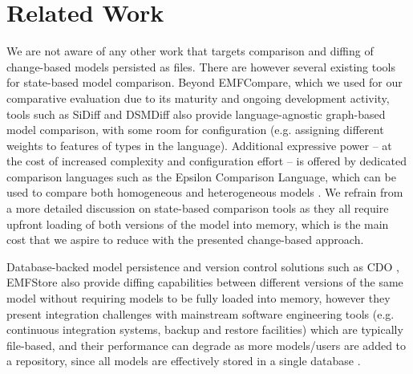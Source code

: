 \section{Related Work}
\label{sec:related_work}
We are not aware of any other work that targets comparison and diffing of change-based models persisted as files. There are however several existing tools for state-based model comparison. Beyond EMFCompare, which we used for our comparative evaluation due to its maturity and ongoing development activity, tools such as SiDiff \cite{Treude2007SiDiff} and DSMDiff \cite{lin2009dsmdiff} also provide language-agnostic graph-based model comparison, with some room for configuration (e.g. assigning different weights to features of types in the language). Additional expressive power -- at the cost of increased complexity and configuration effort -- is offered by dedicated comparison languages such as the Epsilon Comparison Language, which can be used to compare both homogeneous and heterogeneous models \cite{kolovos2009ecl}. We refrain from a more detailed discussion on state-based comparison tools as they all require upfront loading of both versions of the model into memory, which is the main cost that we aspire to reduce with the presented change-based approach.


Database-backed model persistence and version control solutions such as CDO \cite{eclipse2019cdo}, EMFStore \cite{koegel2010emfstore} also provide diffing capabilities between different versions of the same model without requiring models to be fully loaded into memory, however they present integration challenges with mainstream software engineering tools (e.g. continuous integration systems, backup and restore facilities) which are typically file-based, and their performance can degrade as more models/users are added to a repository, since all models are effectively stored in a single database \cite{KolovosRMPGCLRV13}.

